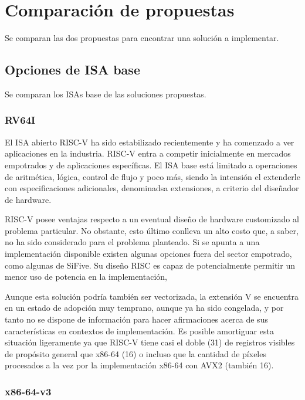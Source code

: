 \documentclass[conference, 14pt]{IEEEtran}
\begin{document}
\section{Comparación de propuestas}

Se comparan las dos propuestas para encontrar una solución a implementar.

\subsection{Opciones de ISA base}

Se comparan los ISAs base de las soluciones propuestas.

\subsubsection{RV64I}

	El ISA abierto RISC-V ha sido estabilizado recientemente y ha comenzado a
	  ver aplicaciones en la industria. RISC-V entra a competir inicialmente en
	  mercados empotrados y de aplicaciones específicas. El ISA base está
	  limitado a operaciones de aritmética, lógica, control de flujo y poco
	  más, siendo la intensión el extenderle con especificaciones adicionales,
	  denominadsa extensiones, a criterio del diseñador de hardware.

	  RISC-V posee ventajas respecto a un eventual diseño de hardware
	  customizado al problema particular. No obstante, esto último conlleva un
	  alto costo que, a saber, no ha sido considerado para el problema
	  planteado. Si se apunta a una implementación disponible existen algunas
	  opciones fuera del sector empotrado, como algunas de SiFive. Su diseño
	  RISC es capaz de potencialmente permitir un menor uso de potencia en la
	  implementación, 

	  Aunque esta solución podría también ser vectorizada, la extensión V se
	  encuentra en un estado de adopción muy temprano, aunque ya ha sido
	  congelada, y por tanto no se dispone de información para hacer
	  afirmaciones acerca de sus características en contextos de
	  implementación. Es posible amortiguar esta situación ligeramente ya que
	  RISC-V tiene casi el doble (31) de registros visibles de propósito
	  general que x86-64 (16) o incluso que la cantidad de píxeles procesados a
	  la vez por la implementación x86-64 con AVX2 (también 16).

\subsubsection{x86-64-v3}
\end{document}
